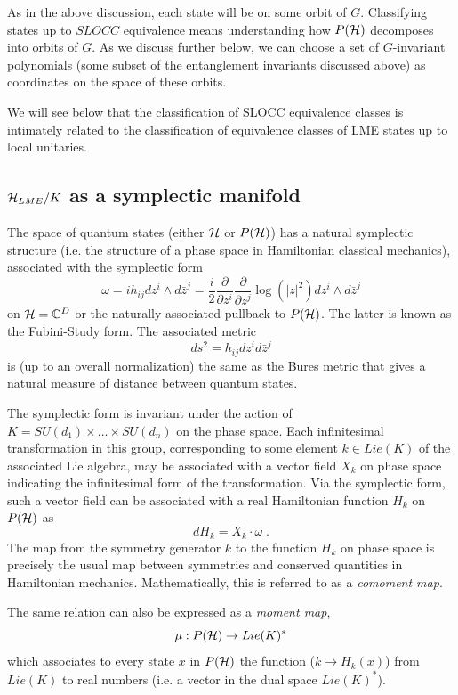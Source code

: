 \documentclass[12pt]{article}
\theoremstyle{definition}
\newcommand{\be}{\begin{equation}}
\newcommand{\ee}{\end{equation}}
\begin{document}
As in the above discussion, each state will be on some orbit of $G$. Classifying states up to $SLOCC$ equivalence means understanding how $P({\cal H})$ decomposes into orbits of $G$. As we discuss further below, we can choose a set of $G$-invariant polynomials (some subset of the entanglement invariants discussed above) as coordinates on the space of these orbits.

We will see below that the classification of SLOCC equivalence classes is intimately related to the classification of equivalence classes of LME states up to local unitaries.

\subsection{${\cal H}_{LME}/K$ as a symplectic manifold}

The space of quantum states (either ${\cal H}$ or $P({\cal H})$) has a natural symplectic structure (i.e. the structure of a phase space in Hamiltonian classical mechanics), associated with the symplectic form
\be
\omega = i h_{ij} dz^{i} \wedge  d\bar{z}^j =  \frac{i}{2} \frac{\partial}{\partial z^i} \frac{\partial}{\partial \bar{z}^j} \log (|z|^2) dz^{i} \wedge  d\bar{z}^j
\ee
on ${\cal H} = \mathbb{C}^D$ or the naturally associated pullback to $P({\cal H})$. The latter is known as the Fubini-Study form. The associated metric
\be
ds^2 = h_{ij} dz^i d \bar{z}^j
\ee
is (up to an overall normalization) the same as the Bures metric that gives a natural measure of distance between quantum states.

The symplectic form is invariant under the action of $K = SU(d_1) \times \dots \times SU(d_n)$ on the phase space. Each infinitesimal transformation  in this group, corresponding to some element $k \in Lie(K)$ of the associated Lie algebra, may be associated with a vector field $X_k$ on phase space indicating the infinitesimal form of the transformation. Via the symplectic form, such a vector field can be associated with a real Hamiltonian function $H_k$ on $P({\cal H})$ as
\be
d H_k = {X_k} \cdot \omega \; .
\ee
The map from the symmetry generator $k$ to the function $H_k$ on phase space is precisely the usual map between symmetries and conserved quantities in Hamiltonian mechanics. Mathematically, this is referred to as a {\it comoment map}.

The same relation can also be expressed as a {\it moment map},
\be
\mu : P({\cal H}) \to Lie(K)^*
\ee
which associates to every state $x$ in $P({\cal H})$ the function ($k \to H_k(x)$) from $Lie(K)$ to real numbers (i.e. a vector in the dual space $Lie(K)^*$).
\end{document}

